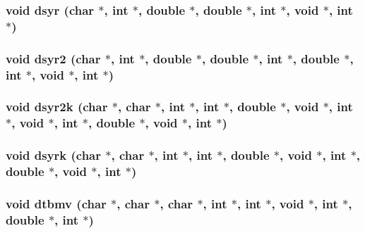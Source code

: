 \subsubsection{\setlength{\rightskip}{0pt plus 5cm}void dsyr (char $\ast$, int $\ast$, double $\ast$, double $\ast$, int $\ast$, void $\ast$, int $\ast$)}\label{essl_8h_aced5526b82617d1e270940584939eda}


\subsubsection{\setlength{\rightskip}{0pt plus 5cm}void dsyr2 (char $\ast$, int $\ast$, double $\ast$, double $\ast$, int $\ast$, double $\ast$, int $\ast$, void $\ast$, int $\ast$)}\label{essl_8h_68a1ff4d8096b1ea29a120bd28385f62}


\subsubsection{\setlength{\rightskip}{0pt plus 5cm}void dsyr2k (char $\ast$, char $\ast$, int $\ast$, int $\ast$, double $\ast$, void $\ast$, int $\ast$, void $\ast$, int $\ast$, double $\ast$, void $\ast$, int $\ast$)}\label{essl_8h_943541d0f0378d2133956fcb19f799b8}


\subsubsection{\setlength{\rightskip}{0pt plus 5cm}void dsyrk (char $\ast$, char $\ast$, int $\ast$, int $\ast$, double $\ast$, void $\ast$, int $\ast$, double $\ast$, void $\ast$, int $\ast$)}\label{essl_8h_d6d36ca0b5d456d791ba8080c1d8e709}


\subsubsection{\setlength{\rightskip}{0pt plus 5cm}void dtbmv (char $\ast$, char $\ast$, char $\ast$, int $\ast$, int $\ast$, void $\ast$, int $\ast$, double $\ast$, int $\ast$)}\label{essl_8h_660192f83be15d14bd67a4f5859952cf}


